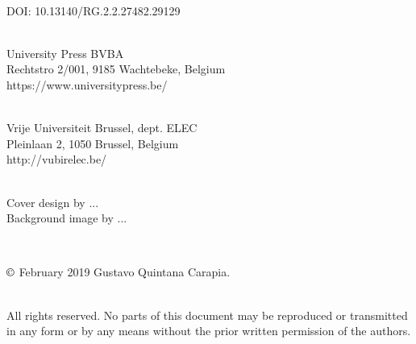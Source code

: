 \documentclass[english,british,BCOR=5mm,DIV=12,fontsize=10pt]{scrbook}
\begin{document}
\newpage{}

~\vfill{}

{\footnotesize{}DOI: 10.13140/RG.2.2.27482.29129}\\ %
{\footnotesize{}~}{\footnotesize\par}

{\footnotesize{}University Press BVBA}\\
{\footnotesize{}Rechtstro 2/001, 9185 Wachtebeke, Belgium }\\
{\footnotesize{}https://www.universitypress.be/}\\
{\footnotesize{}~}{\footnotesize\par}

{\footnotesize{}Vrije Universiteit Brussel, dept. ELEC}\\
{\footnotesize{}Pleinlaan 2, 1050 Brussel, Belgium}\\
{\footnotesize{}http://vubirelec.be/}\\
{\footnotesize{}~}{\footnotesize\par}

{\footnotesize{}Cover design by ...}\\
{\footnotesize{}Background image by ...}{\footnotesize\par}
{\footnotesize{}~}{\footnotesize\par}

{\footnotesize{}$\copyright$ February 2019 Gustavo Quintana Carapia.}\\
{\footnotesize{}~}{\footnotesize\par}


{\footnotesize{}All rights reserved. No parts of this document may be reproduced or transmitted in any form or by any means without the prior written permission of the authors.}{\footnotesize\par}

{\footnotesize\par}

\newpage{}
{}



\tableofcontents{}
\end{document}
